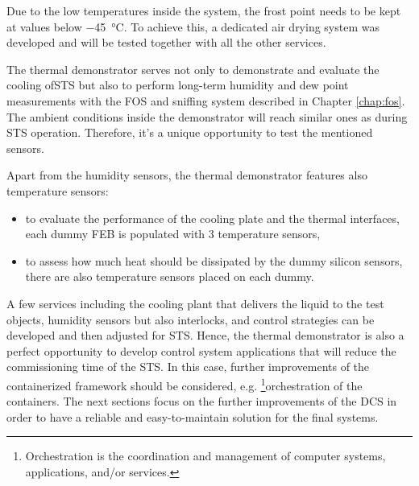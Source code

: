  Due to the low temperatures inside the system, the frost point needs to be kept at values below \SI{-45}{\celsius}. To achieve this, a dedicated air drying system was developed and will be tested together with all the other services. 
 
 The thermal demonstrator serves not only to demonstrate and evaluate the cooling of\gls{STS} but also to perform long-term humidity and dew point measurements with the \gls{FOS} and sniffing system described in Chapter \ref{chap:fos}. The ambient conditions inside the demonstrator will reach similar ones as during \gls{STS} operation. Therefore, it's a unique opportunity to test the mentioned sensors.
 
 Apart from the humidity sensors, the thermal demonstrator features also temperature sensors:
 \begin{itemize}
     \item to evaluate the performance of the cooling plate and the thermal interfaces, each dummy \gls{FEB} is populated with 3 temperature sensors,
     \item to assess how much heat should be dissipated by the dummy silicon sensors, there are also temperature sensors placed on each dummy.
 \end{itemize}

A few services including the cooling plant that delivers the liquid to the test objects, humidity sensors but also interlocks, and control strategies can be developed and then adjusted for \gls{STS}. Hence, the thermal demonstrator is also a perfect opportunity to develop control system applications that will reduce the commissioning time of the \gls{STS}. In this case, further improvements of the containerized framework should be considered, e.g. \footnote{Orchestration is the coordination and management of computer systems, applications, and/or services.}{orchestration} of the containers. The next sections focus on the further improvements of the \gls{DCS} in order to have a reliable and easy-to-maintain solution for the final systems. 